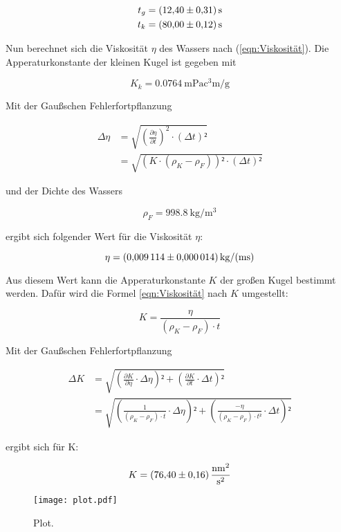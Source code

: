 \begin{align*}
t_g &= \SI{12.40+-0.31}{\second}\\
t_k &= \SI{80.00+-0.12}{\second}
\end{align*}

Nun berechnet sich die Viskosität $\eta$ des Wassers nach (\ref{eqn:Viskosität}).
Die Apperaturkonstante der kleinen Kugel ist gegeben mit 

\begin{equation}
K_k = \SI{0.0764}{\milli\pascal\cubic\centi\meter\per\gram}
\end{equation}

Mit der Gaußschen Fehlerfortpflanzung

\begin{align}
\Delta \eta &= \sqrt{\left(\frac{\partial\eta}{\partial t}\right)^2 \cdot \left(\Delta t\right)²}\\
&=\sqrt{\left(K\cdot(\rho_K - \rho_F)\right)²\cdot(\Delta t)²}
\end{align}

und der Dichte des Wassers 

\begin{equation}
\rho _F = \SI{998.8}{\kilo\gram\per\cubic\meter}
\end{equation}

ergibt sich folgender Wert für die Viskosität $\eta$:

\begin{equation}
\eta = \SI{0.009114+-0.000014}{\kilo\gram\per(\meter\second)}
\end{equation}

Aus diesem Wert kann die Apperaturkonstante $K$ der großen Kugel
bestimmt werden. Dafür wird die Formel \ref{eqn:Viskosität} nach 
$K$ umgestellt: 

\begin{equation}
K = \frac{\eta}{(\rho_K - \rho_F) \cdot t}
\end{equation}

Mit der Gaußschen Fehlerfortpflanzung

\begin{align}
\Delta K &= \sqrt{\left(\frac{\partial K}{\partial \eta}\cdot \Delta\eta\right)² + \left(\frac{\partial K}{\partial t}\cdot \Delta t\right)²}\\
&= \sqrt{\left(\frac{1}{(\rho_K - \rho_F)\cdot t}\cdot \Delta\eta\right)² + \left(\frac{-\eta}{(\rho_K - \rho_F)\cdot t²}\cdot \Delta t\right)²}
\end{align}

ergibt sich für K: 

\begin{equation}
K = \SI{76.40+-0.16}{\nano\meter\squared\per\second\squared}
\end{equation}

\begin{figure}
  \centering
  \texttt{[image: plot.pdf]}
  \caption{Plot.}
  \label{fig:plot}
\end{figure}
